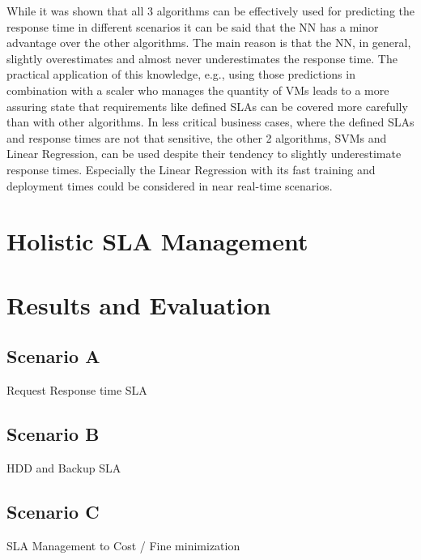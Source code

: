 While it was shown that all 3 algorithms can be effectively used for predicting the response time in different scenarios it can be said that the NN has a minor advantage over the other algorithms. The main reason is that the NN, in general, slightly overestimates and almost never underestimates the response time. The practical application of this knowledge, e.g., using those predictions in combination with a scaler who manages the quantity of VMs leads to a more assuring state that requirements like defined SLAs can be covered more carefully than with other algorithms. In less critical business cases, where the defined SLAs and response times are not that sensitive, the other 2 algorithms, SVMs and Linear Regression, can be used despite their tendency to slightly underestimate response times. Especially the Linear Regression with its fast training and deployment times could be considered in near real-time scenarios.








\section{Holistic SLA Management}



\section{Results and Evaluation}

\subsection{Scenario A}
Request Response time SLA


\subsection{Scenario B}
HDD and Backup SLA

\subsection{Scenario C}
SLA Management to Cost / Fine minimization